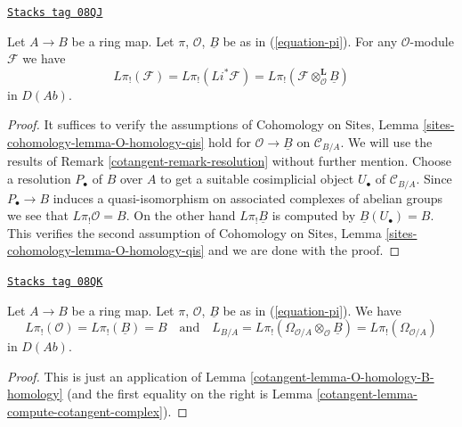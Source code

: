 \begin{lemma}
\label{cotangent-lemma-O-homology-B-homology}
\href{https://stacks.math.columbia.edu/tag/08QJ}{\texttt{Stacks tag 08QJ}}

Let $A \to B$ be a ring map. Let $\pi$, $\mathcal{O}$, $\underline{B}$
be as in (\ref{equation-pi}). For any $\mathcal{O}$-module $\mathcal{F}$
we have
$$
L\pi_!(\mathcal{F}) = L\pi_!(Li^*\mathcal{F}) =
L\pi_!(\mathcal{F} \otimes_\mathcal{O}^\mathbf{L} \underline{B})
$$
in $D(\textit{Ab})$.
\end{lemma}

\begin{proof}

It suffices to verify the assumptions of Cohomology on Sites, Lemma
\ref{sites-cohomology-lemma-O-homology-qis}
hold for $\mathcal{O} \to \underline{B}$ on $\mathcal{C}_{B/A}$.
We will use the results of Remark \ref{cotangent-remark-resolution} without
further mention. Choose a resolution $P_\bullet$ of $B$ over $A$ to get a
suitable cosimplicial object $U_\bullet$ of $\mathcal{C}_{B/A}$.
Since $P_\bullet \to B$ induces a quasi-isomorphism on associated
complexes of abelian groups we see that $L\pi_!\mathcal{O} = B$.
On the other hand $L\pi_!\underline{B}$ is computed by
$\underline{B}(U_\bullet) = B$. This verifies the second assumption of
Cohomology on Sites, Lemma
\ref{sites-cohomology-lemma-O-homology-qis}
and we are done with the proof.
\end{proof}

\begin{lemma}
\label{cotangent-lemma-apply-O-B-comparison}
\href{https://stacks.math.columbia.edu/tag/08QK}{\texttt{Stacks tag 08QK}}

Let $A \to B$ be a ring map. Let $\pi$, $\mathcal{O}$, $\underline{B}$
be as in (\ref{equation-pi}). We have
$$
L\pi_!(\mathcal{O}) = L\pi_!(\underline{B}) = B
\quad\text{and}\quad
L_{B/A} = L\pi_!(\Omega_{\mathcal{O}/A} \otimes_\mathcal{O} \underline{B}) =
L\pi_!(\Omega_{\mathcal{O}/A})
$$
in $D(\textit{Ab})$.
\end{lemma}

\begin{proof}

This is just an application of Lemma \ref{cotangent-lemma-O-homology-B-homology}
(and the first equality on the right is
Lemma \ref{cotangent-lemma-compute-cotangent-complex}).
\end{proof}

